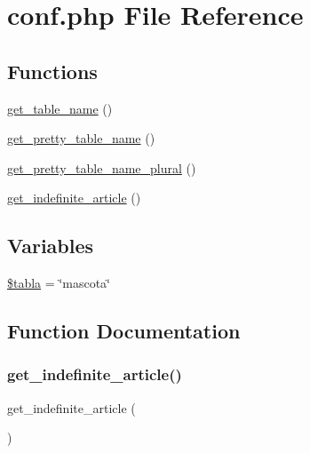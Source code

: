 \hypertarget{conf_8php}{}\section{conf.\+php File Reference}
\label{conf_8php}
\subsection*{Functions}
\begin{DoxyCompactItemize}
\item 
\hyperlink{conf_8php_aa6ab823c47bed35ec59f141ad6ae9dd5}{get\+\_\+table\+\_\+name} ()
\item 
\hyperlink{conf_8php_a3fab989ac8d6b468dca008270aabc9e6}{get\+\_\+pretty\+\_\+table\+\_\+name} ()
\item 
\hyperlink{conf_8php_a2d4181533ea71ae029ba610391dff3f4}{get\+\_\+pretty\+\_\+table\+\_\+name\+\_\+plural} ()
\item 
\hyperlink{conf_8php_a5e7a1f5e1bfffc943d1b848af58499ab}{get\+\_\+indefinite\+\_\+article} ()
\end{DoxyCompactItemize}
\subsection*{Variables}
\begin{DoxyCompactItemize}
\item 
\hyperlink{conf_8php_a729c521d99d919a188fcf3ce7ea8abf4}{\$tabla} = \char`\"{}mascota\char`\"{}
\end{DoxyCompactItemize}


\subsection{Function Documentation}
\hypertarget{conf_8php_a5e7a1f5e1bfffc943d1b848af58499ab}{}\label{conf_8php_a5e7a1f5e1bfffc943d1b848af58499ab} 
\subsubsection{\texorpdfstring{get\+\_\+indefinite\+\_\+article()}{get\_indefinite\_article()}}
{\footnotesize\ttfamily get\+\_\+indefinite\+\_\+article (\begin{DoxyParamCaption}{ }\end{DoxyParamCaption})}


